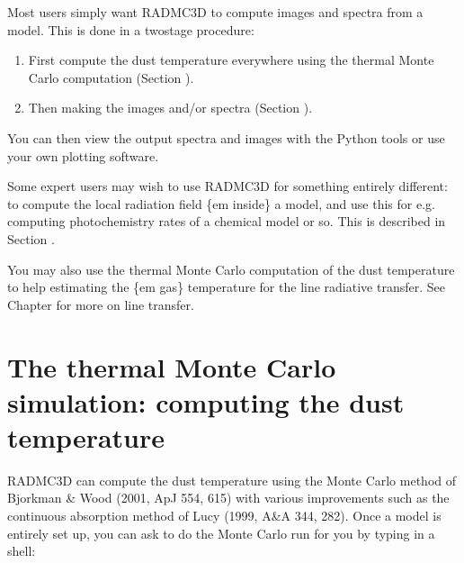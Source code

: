 \documentclass[letterpaper,10pt,english]{sphinxmanual}
\begin{document}
Most users simply want RADMC\sphinxhyphen{}3D to compute images and spectra from a
model. This is done in a two\sphinxhyphen{}stage procedure:
\begin{enumerate}
%
\item {} 
First compute the dust temperature everywhere using the thermal Monte
Carlo computation (Section {\hyperref[\detokenize{dustradtrans:sec-dust-thermal-monte-carlo}]{}}).

\item {} 
Then making the images and/or spectra (Section {\hyperref[\detokenize{dustradtrans:sec-dust-ray-tracing}]{}}).

\end{enumerate}

You can then view the output spectra and images with the Python tools or use
your own plotting software.

Some expert users may wish to use RADMC\sphinxhyphen{}3D for something entirely different:
to compute the local radiation field \{em inside\} a model, and use this
for e.g. computing photochemistry rates of a chemical model or so.
This is described in Section {\hyperref[\detokenize{dustradtrans:sec-dust-monochromatic-monte-carlo}]{}}.

You may also use the thermal Monte Carlo computation of the dust temperature
to help estimating the \{em gas\} temperature for the line radiative transfer.
See Chapter {\hyperref[\detokenize{lineradtrans:chap-line-transfer}]{}} for more on line transfer.


\section{The thermal Monte Carlo simulation: computing the dust temperature}
\label{\detokenize{dustradtrans:the-thermal-monte-carlo-simulation-computing-the-dust-temperature}}\label{\detokenize{dustradtrans:sec-dust-thermal-monte-carlo}}
RADMC\sphinxhyphen{}3D can compute the dust temperature using the Monte Carlo method of
Bjorkman \& Wood (2001, ApJ 554, 615) with various improvements such as the
continuous absorption method of Lucy (1999, A\&A 344, 282). Once a model is
entirely set up, you can ask  to do the Monte Carlo
run for you by typing in a shell:
\end{document}
